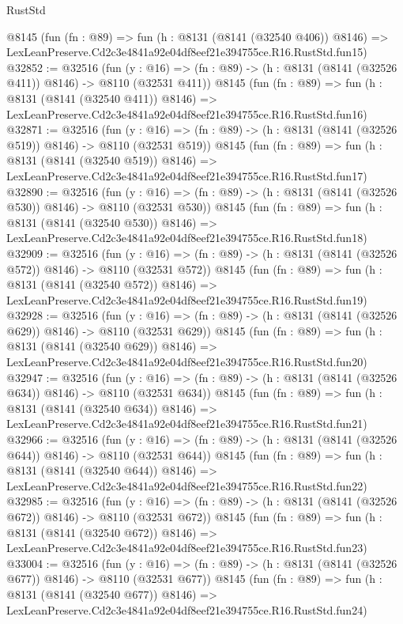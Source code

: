 \begin{lexlean}{RustStd}
\begin{coremodule}
    @8145
    (fun (fn : @89) =>
    fun (h : @8131 (@8141 (@32540 @406)) @8146) =>
    LexLeanPreserve.Cd2c3e4841a92e04df8eef21e394755ce.R16.RustStd.fun15)
@32852 := @32516
    (fun (y : @16) => (fn : @89) -> (h : @8131 (@8141 (@32526 @411)) @8146) -> @8110 (@32531 @411))
    @8145
    (fun (fn : @89) =>
    fun (h : @8131 (@8141 (@32540 @411)) @8146) =>
    LexLeanPreserve.Cd2c3e4841a92e04df8eef21e394755ce.R16.RustStd.fun16)
@32871 := @32516
    (fun (y : @16) => (fn : @89) -> (h : @8131 (@8141 (@32526 @519)) @8146) -> @8110 (@32531 @519))
    @8145
    (fun (fn : @89) =>
    fun (h : @8131 (@8141 (@32540 @519)) @8146) =>
    LexLeanPreserve.Cd2c3e4841a92e04df8eef21e394755ce.R16.RustStd.fun17)
@32890 := @32516
    (fun (y : @16) => (fn : @89) -> (h : @8131 (@8141 (@32526 @530)) @8146) -> @8110 (@32531 @530))
    @8145
    (fun (fn : @89) =>
    fun (h : @8131 (@8141 (@32540 @530)) @8146) =>
    LexLeanPreserve.Cd2c3e4841a92e04df8eef21e394755ce.R16.RustStd.fun18)
@32909 := @32516
    (fun (y : @16) => (fn : @89) -> (h : @8131 (@8141 (@32526 @572)) @8146) -> @8110 (@32531 @572))
    @8145
    (fun (fn : @89) =>
    fun (h : @8131 (@8141 (@32540 @572)) @8146) =>
    LexLeanPreserve.Cd2c3e4841a92e04df8eef21e394755ce.R16.RustStd.fun19)
@32928 := @32516
    (fun (y : @16) => (fn : @89) -> (h : @8131 (@8141 (@32526 @629)) @8146) -> @8110 (@32531 @629))
    @8145
    (fun (fn : @89) =>
    fun (h : @8131 (@8141 (@32540 @629)) @8146) =>
    LexLeanPreserve.Cd2c3e4841a92e04df8eef21e394755ce.R16.RustStd.fun20)
@32947 := @32516
    (fun (y : @16) => (fn : @89) -> (h : @8131 (@8141 (@32526 @634)) @8146) -> @8110 (@32531 @634))
    @8145
    (fun (fn : @89) =>
    fun (h : @8131 (@8141 (@32540 @634)) @8146) =>
    LexLeanPreserve.Cd2c3e4841a92e04df8eef21e394755ce.R16.RustStd.fun21)
@32966 := @32516
    (fun (y : @16) => (fn : @89) -> (h : @8131 (@8141 (@32526 @644)) @8146) -> @8110 (@32531 @644))
    @8145
    (fun (fn : @89) =>
    fun (h : @8131 (@8141 (@32540 @644)) @8146) =>
    LexLeanPreserve.Cd2c3e4841a92e04df8eef21e394755ce.R16.RustStd.fun22)
@32985 := @32516
    (fun (y : @16) => (fn : @89) -> (h : @8131 (@8141 (@32526 @672)) @8146) -> @8110 (@32531 @672))
    @8145
    (fun (fn : @89) =>
    fun (h : @8131 (@8141 (@32540 @672)) @8146) =>
    LexLeanPreserve.Cd2c3e4841a92e04df8eef21e394755ce.R16.RustStd.fun23)
@33004 := @32516
    (fun (y : @16) => (fn : @89) -> (h : @8131 (@8141 (@32526 @677)) @8146) -> @8110 (@32531 @677))
    @8145
    (fun (fn : @89) =>
    fun (h : @8131 (@8141 (@32540 @677)) @8146) =>
    LexLeanPreserve.Cd2c3e4841a92e04df8eef21e394755ce.R16.RustStd.fun24)

\end{coremodule}
\end{lexlean}
